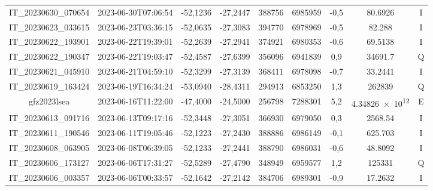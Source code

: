 \begin{table}[htb!]
\begin{tabular}{ccccS[table-format=6.0]S[table-format=7.0]ccc}
            IT\_20230630\_070654 & 2023-06-30T07:06:54 & -52,1236 & -27,2447 & 388756 & 6985959 & -0,5 & \num[round-precision=3,round-mode=figures,scientific-notation=true]{80.6926} & I \\
            IT\_20230623\_033615 & 2023-06-23T03:36:15 & -52,0635 & -27,3083 & 394770 & 6978969 & -0,5 & \num[round-precision=3,round-mode=figures,scientific-notation=true]{82.288} & I \\
            IT\_20230622\_193901 & 2023-06-22T19:39:01 & -52,2639 & -27,2941 & 374921 & 6980353 & -0,6 & \num[round-precision=3,round-mode=figures,scientific-notation=true]{69.5138} & I \\
            IT\_20230622\_190347 & 2023-06-22T19:03:47 & -52,4587 & -27,6399 & 356096 & 6941839 & 0,9 & \num[round-precision=3,round-mode=figures,scientific-notation=true]{34691.7} & Q \\
            IT\_20230621\_045910 & 2023-06-21T04:59:10 & -52,3299 & -27,3139 & 368411 & 6978098 & -0,7 & \num[round-precision=3,round-mode=figures,scientific-notation=true]{33.2441} & I \\
            IT\_20230619\_163424 & 2023-06-19T16:34:24 & -53,0940 & -28,4311 & 294913 & 6853250 & 1,3 & \num[round-precision=3,round-mode=figures,scientific-notation=true]{262839} & Q \\
            gfz2023lsea & 2023-06-16T11:22:00 & -47,4000 & -24,5000 & 256798 & 7288301 & 5,2 & \num[round-precision=3,round-mode=figures,scientific-notation=true]{4.34826e+12} & E \\
            IT\_20230613\_091716 & 2023-06-13T09:17:16 & -52,3448 & -27,3051 & 366930 & 6979050 & 0,3 & \num[round-precision=3,round-mode=figures,scientific-notation=true]{2568.54} & I \\
            IT\_20230611\_190546 & 2023-06-11T19:05:46 & -52,1223 & -27,2430 & 388886 & 6986149 & -0,1 & \num[round-precision=3,round-mode=figures,scientific-notation=true]{625.703} & I \\
            IT\_20230608\_063905 & 2023-06-08T06:39:05 & -52,1233 & -27,2441 & 388790 & 6986031 & -0,6 & \num[round-precision=3,round-mode=figures,scientific-notation=true]{48.8092} & I \\
            IT\_20230606\_173127 & 2023-06-06T17:31:27 & -52,5289 & -27,4790 & 348949 & 6959577 & 1,2 & \num[round-precision=3,round-mode=figures,scientific-notation=true]{125331} & Q \\
            IT\_20230606\_003357 & 2023-06-06T00:33:57 & -52,1642 & -27,2142 & 384706 & 6989301 & -0,9 & \num[round-precision=3,round-mode=figures,scientific-notation=true]{17.2632} & I \\

\end{tabular}
\end{table}
